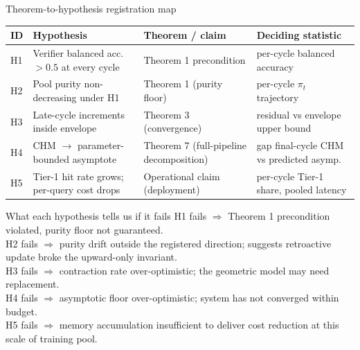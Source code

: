 \documentclass[10pt,aspectratio=169]{beamer}
\begin{document}
\begin{frame}{Theorem-to-hypothesis registration map}
  \scriptsize
  \begin{tabular}{@{}p{0.6cm}p{4cm}p{4cm}p{4cm}@{}}
    \toprule
    \textbf{ID} & \textbf{Hypothesis} & \textbf{Theorem / claim} & \textbf{Deciding statistic} \\
    \midrule
    H1 & Verifier balanced acc.\ $> 0.5$ at every cycle & Theorem 1 precondition & per-cycle balanced accuracy \\
    H2 & Pool purity non-decreasing under H1 & Theorem 1 (purity floor) & per-cycle $\pi_t$ trajectory \\
    H3 & Late-cycle increments inside envelope & Theorem 3 (convergence) & residual vs envelope upper bound \\
    H4 & CHM $\to$ parameter-bounded asymptote & Theorem 7 (full-pipeline decomposition) & gap final-cycle CHM vs predicted asymp.\ \\
    H5 & Tier-1 hit rate grows; per-query cost drops & Operational claim (deployment) & per-cycle Tier-1 share, pooled latency \\
    \bottomrule
  \end{tabular}

  \vspace{0.5em}
  \begin{block}{What each hypothesis tells us if it fails}
    H1 fails $\Rightarrow$ Theorem 1 precondition violated, purity floor not guaranteed.\\
    H2 fails $\Rightarrow$ purity drift outside the registered direction; suggests retroactive update broke the upward-only invariant.\\
    H3 fails $\Rightarrow$ contraction rate over-optimistic; the geometric model may need replacement.\\
    H4 fails $\Rightarrow$ asymptotic floor over-optimistic; system has not converged within budget.\\
    H5 fails $\Rightarrow$ memory accumulation insufficient to deliver cost reduction at this scale of training pool.
  \end{block}
\end{frame}
\end{document}
